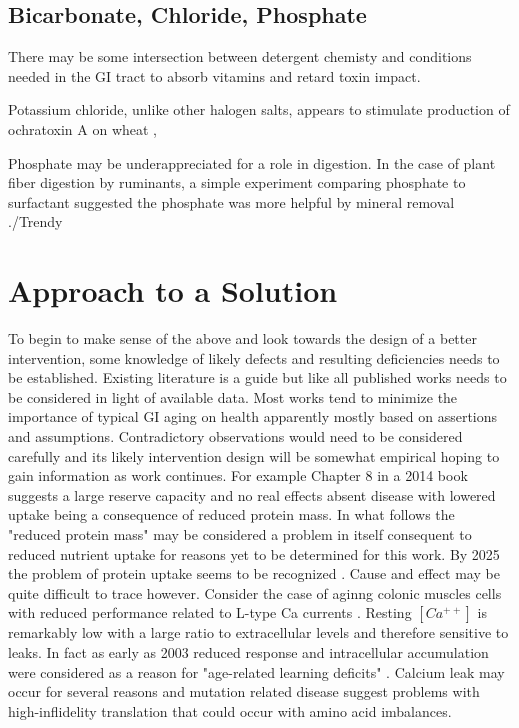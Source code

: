 \subsection{Bicarbonate, Chloride, Phosphate }
There may be some intersection between detergent chemisty and
conditions needed in the GI tract to absorb vitamins and
retard toxin impact. 

Potassium chloride, unlike other halogen salts, appears to
stimulate production of ochratoxin A on wheat
\cite{Stander_Steyn_Lubben_Influence_Halogen_Salts_2000},



Phosphate may be underappreciated for a role in 
digestion. In the case of plant fiber digestion by ruminants,
a simple experiment comparing phosphate to surfactant 
suggested the phosphate was more helpful by mineral removal
\cite{KENNEDY2000177}./Trendy





\section{ Approach to a Solution  }
To begin to make sense of the above and look towards
the design of a better intervention, some knowledge
of likely defects and resulting deficiencies needs to be
established. Existing literature is a guide but like all
published works needs to be considered in light of available
data. Most works tend to minimize the importance of 
typical GI aging on health apparently mostly based on
assertions and assumptions. Contradictory observations
would need to be considered carefully and its likely intervention
design will be somewhat empirical hoping to gain information
as work continues.   For example Chapter 8
in a 2014 book \cite{UDwPBAAAQBAJ} suggests a large reserve capacity
and no real effects absent disease with lowered uptake
being a consequence of reduced protein mass. In what follows
the "reduced protein mass" may be considered a problem in itself
consequent to reduced nutrient uptake for reasons
yet to be determined for this work. 
By 2025 the problem of protein uptake seems to be recognized
\cite{Hinssen_Mensink_Huppertz_Impact_aging_NBSPon_2025}
\cite{Qiu_Shi_Wu_Altered_Digestive_Absorptive_2026}.
Cause and effect may be
quite difficult to trace however. Consider the case
of aginng colonic muscles cells with reduced performance
related to L-type Ca currents 
\cite{Camilleri_aging_gastrointestinal_tract_2022}.
Resting $[Ca^{++}]$ is remarkably low with a large
ratio to extracellular levels 
\cite{Kawamoto_Vivar_Camandola_Physiology_Pathology_2012}
and therefore   sensitive to leaks.
In fact as early as 2003 reduced response and intracellular accumulation
were considered as a reason for "age-related learning deficits"
\cite{PMID12591115}. Calcium leak may occur for several reasons
\cite{marchywka-MJM-2022-010-0.80} \cite{mmarchywka-MJM-2020-002-0.12rg}
and mutation related disease suggest problems with high-inflidelity
translation that could occur with amino acid imbalances.

